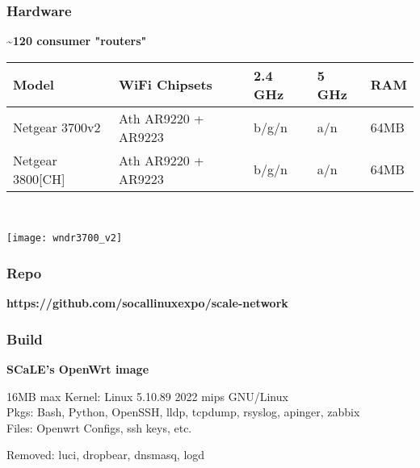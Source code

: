 \documentclass{beamer}
\begin{document}
\begin{frame}
\frametitle{Hardware}
  \begin{center}
    {\large \textbf{ \textasciitilde 120 consumer "routers"} \\[20pt]}
    \small{
    \begin{tabular}{| l | l | l | l | l |}
      \hline
      Model & WiFi Chipsets & 2.4 GHz & 5 GHz & RAM \\ \hline
      Netgear 3700v2 & Ath AR9220 + AR9223  & b/g/n & a/n & 64MB \\ \hline
      Netgear 3800[CH] & Ath AR9220 + AR9223 & b/g/n & a/n & 64MB \\ \hline
    \end{tabular} \\[20pt]
    }
  \texttt{[image: wndr3700\_v2]}
  \end{center}
\end{frame}

\begin{frame}
\frametitle{Repo}
  \begin{center}
  {\large \textbf{https://github.com/socallinuxexpo/scale-network}}
  \end{center}
\end{frame}


\begin{frame}
  \frametitle{Build}
  {\large \textbf{SCaLE's OpenWrt image}} \\[20pt]
  \begin{block}{16MB max}
    Kernel: Linux 5.10.89 2022 mips GNU/Linux \\
  Pkgs: Bash, Python, OpenSSH, lldp, tcpdump, rsyslog, apinger, zabbix \\
  Files: Openwrt Configs, ssh keys, etc.
  \end{block}
  Removed: luci, dropbear, dnsmasq, logd \\[20pt]

\end{frame}
\end{document}
